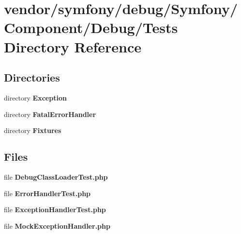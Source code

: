 \section{vendor/symfony/debug/\+Symfony/\+Component/\+Debug/\+Tests Directory Reference}
\label{dir_7d15487a1d2ff2767b6104465c09ae4b}
\subsection*{Directories}
\begin{DoxyCompactItemize}
\item 
directory {\bf Exception}
\item 
directory {\bf Fatal\+Error\+Handler}
\item 
directory {\bf Fixtures}
\end{DoxyCompactItemize}
\subsection*{Files}
\begin{DoxyCompactItemize}
\item 
file {\bf Debug\+Class\+Loader\+Test.\+php}
\item 
file {\bf Error\+Handler\+Test.\+php}
\item 
file {\bf Exception\+Handler\+Test.\+php}
\item 
file {\bf Mock\+Exception\+Handler.\+php}
\end{DoxyCompactItemize}
